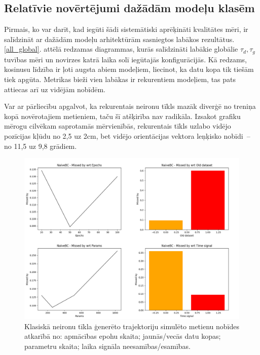 \documentclass[12pt, a4paper]{article}
\numberwithin{equation}{section} %
\begin{document}
\subsection{Relatīvie novērtējumi dažādām modeļu klasēm}

Pirmais, ko var darīt, kad iegūti šādi sistemātiski aprēķināti kvalitātes mēri, ir salīdzināt ar dažādām modeļu arhitektūrām sasniegtos labākos rezultātus. \ref{all_global}. attēlā redzamas diagrammas, kurās salīdzināti labākie globālie $\tau_d, \tau_g$ tuvības mēri un novirzes katrā laika solī iegūtajās konfigurācijās. Kā redzams, kosinusu līdzība ir ļoti augsta abiem modeļiem, liecinot, ka datu kopa tik tiešām tiek apgūta. Metrikas bieži vien labākas ir rekurentiem modeļiem, tas pats attiecas arī uz vidējām nobīdēm. 

Var ar pārliecību apgalvot, ka rekurentais neironu tīkls mazāk diverģē no treniņa kopā novērotajiem metieniem, taču šī atšķirība nav radikāla. Izsakot grafiku mērogu cilvēkam saprotamās mērvienībās, rekurentais tīkls uzlabo vidējo pozīcijas kļūdu no 2,5 uz 2cm, bet vidējo orientācijas vektora leņķisko nobīdi~-- no 11,5 uz 9,8 grādiem.

\begin{figure}[t!]
    \centering
    \includegraphics[width=16cm,page=1]{../img/naivebc_missed.png}
    \caption{Klasiskā neironu tīkla ģenerēto trajektoriju simulēto metienu nobīdes atkarībā no: apmācības epohu skaita; jaunās/vecās datu kopas; parametru skaita; laika signāla neesamības/esamības.}
    \label{classic_total}
\end{figure}
\end{document}
